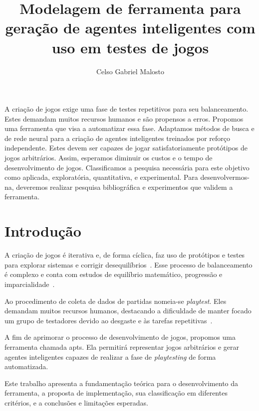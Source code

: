 \documentclass[12pt]{article}
\title{Modelagem de ferramenta para geração de agentes inteligentes com uso em testes de jogos}
\author{%
    Celso Gabriel Malosto\inst{1}%
}
\begin{document}
\maketitle

\begin{resumo}

    A criação de jogos exige uma fase de testes repetitivos para seu balanceamento.
    Estes demandam muitos recursos humanos e são propensos a erros.
    Propomos uma ferramenta que visa a automatizar essa fase.
    Adaptamos métodos de busca e de rede neural para a criação de agentes inteligentes treinados por reforço independente.
    Estes devem ser capazes de jogar satisfatoriamente protótipos de jogos arbitrários.
    Assim, esperamos diminuir os custos e o tempo de desenvolvimento de jogos.
    Classificamos a pesquisa necessária para este objetivo como aplicada, exploratória, quantitativa, e experimental.
    Para desenvolvermos-na, deveremos realizar pesquisa bibliográfica e experimentos que validem a ferramenta.

\end{resumo}

\section{Introdução}%
\label{sec:introducao}

A criação de jogos é iterativa e, de forma cíclica, faz uso de protótipos e testes para explorar sistemas e corrigir desequilíbrios~\cite{marcelo2009design, fullerton2019game}.
Esse processo de balanceamento é complexo e conta com estudos de equilíbrio matemático, progressão e imparcialidade~\cite{romeroGameBalance2021}.

Ao procedimento de coleta de dados de partidas nomeia-se \textit{playtest}.
Eles demandam muitos recursos humanos, destacando a dificuldade de manter focado um grupo de testadores devido ao desgaste e às tarefas repetitivas~\cite{trzewiczek2017}.

A fim de aprimorar o processo de desenvolvimento de jogos, propomos uma ferramenta chamada \gls{apts}.
Ela permitirá representar jogos arbitrários e gerar agentes inteligentes capazes de realizar a fase de \textit{playtesting} de forma automatizada.

Este trabalho apresenta a fundamentação teórica para o desenvolvimento da ferramenta, a proposta de implementação, sua classificação em diferentes critérios, e a conclusões e limitações esperadas.
\end{document}
